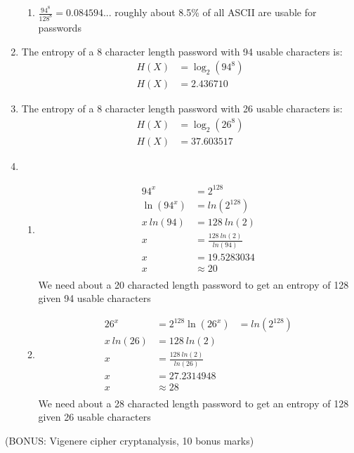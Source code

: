 \documentclass{assignment}
\begin{document}
\begin{problemlist}
\begin{problem}
\begin{answer}
\begin{enumerate}[label=(\alph*)]
\begin{enumerate}[label=(\roman*)]
			\item $\frac{94^8}{128^8} = 0.084594... $ 
				  roughly about 8.5\% of all ASCII are usable for passwords
			\end{enumerate}
	\item The entropy of a 8 character length password with 94 usable characters is: 
		\begin{align*}
		H(X) &= \log_2(94^8) \\  
		H(X) &= 2.436710
		\end{align*}
		
	\item  The entropy of a 8 character length password with 26 usable characters is: 
		\begin{align*}
		H(X) &= \log_2(26^8) \\  
		H(X) &= 37.603517
		\end{align*}
	\item 	\begin{enumerate}[label=(\roman*)]
			\item     \begin{align*}
					94^x &= 2^{128}  \\
				 	\ln(94^x) &= ln(2^{128}) \\
				  	x \: ln(94) &= 128 \: ln(2) \\
				  	x &= \frac{128 \: ln(2)}{ln(94)} \\
				  	x &= 19.5283034 \\
				  	x &\approx 20 \\
				  \end{align*}
				  	We need about a 20 characted length password to get an entropy of 128 given 94 usable characters
			\item 	\begin{align*}
						26^x &= 2^{128}
						\ln(26^x) &= ln(2^{128}) \\
				  		x \: ln(26) &= 128 \: ln(2) \\
				  		x &= \frac{128 \: ln(2)}{ln(26)} \\
				  		x &= 27.2314948 \\
				  		x &\approx 28 \\
					\end{align*}
					We need about a 28 characted length password to get an entropy of 128 given 26 usable characters
			\end{enumerate}
\end{enumerate}
\end{answer}
\end{problem}
\setcounter{enumi}{6}
\pbitem  (BONUS: Vigenere cipher cryptanalysis, 10 bonus marks)


\end{problemlist}
\end{document}
